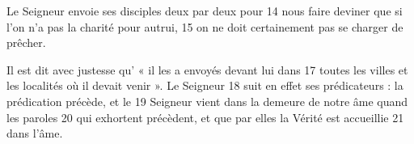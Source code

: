 Le Seigneur envoie ses disciples deux par deux pour	 
14	 	nous faire deviner que si l'on n'a pas la charité pour autrui,	 
15	 	on ne doit certainement pas se charger de prêcher.

Il est dit avec justesse qu' « il les a envoyés devant lui dans	 
17	 	toutes les villes et les localités où il devait venir ». Le Seigneur	 
18	 	suit en effet ses prédicateurs : la prédication précède, et le	 
19	 	Seigneur vient dans la demeure de notre âme quand les paroles	 
20	 	qui exhortent précèdent, et que par elles la Vérité est accueillie	 
21	 	dans l'âme.